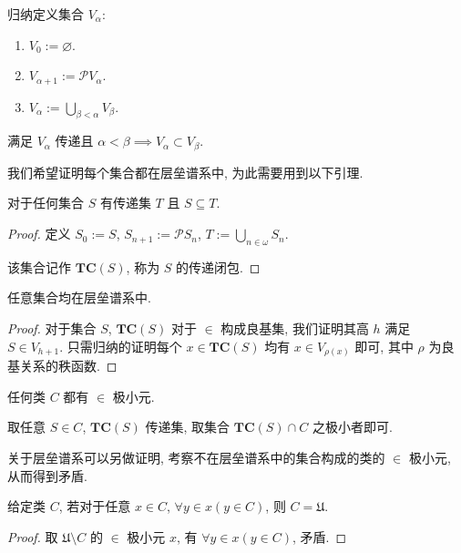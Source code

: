 \begin{definition}
    归纳定义集合 \(V_\alpha\):

    \begin{enumerate}
        \item \(V_0 := \varnothing\).
        \item \(V_{\alpha + 1} := \mathcal{P} V_\alpha\).
        \item \(V_\alpha := \bigcup_{\beta < \alpha} V_\beta\).
    \end{enumerate}

    满足 \(V_\alpha\) 传递且 \(\alpha < \beta \implies V_\alpha \subset V_\beta\).
\end{definition}

我们希望证明每个集合都在层垒谱系中, 为此需要用到以下引理.

\begin{lemma}
    对于任何集合 \(S\) 有传递集 \(T\) 且 \(S \subseteq T\).

    \begin{proof}
        定义 \(S_0 := S\), \(S_{n + 1} := \mathcal{P} S_n\), \(T := \bigcup_{n \in \omega} S_n\).

        该集合记作 \(\mathbf{TC}(S)\), 称为 \(S\) 的传递闭包.
    \end{proof}
\end{lemma}

\begin{lemma}
    \label {lemma:every set is in V_alpha}
    任意集合均在层垒谱系中.

    \begin{proof}
        对于集合 \(S\), \(\mathbf{TC}(S)\) 对于 \(\in\) 构成良基集, 我们证明其高 \(h\) 满足 \(S \in V_{h + 1}\).
        只需归纳的证明每个 \(x \in \mathbf{TC}(S)\) 均有 \(x \in V_{\rho (x)}\) 即可, 其中 \(\rho\) 为良基关系的秩函数.
    \end{proof}
\end{lemma}

\begin{lemma}
    任何类 \(C\) 都有 \(\in\) 极小元.

    取任意 \(S \in C\), \(\mathbf{TC}(S)\) 传递集, 取集合 \(\mathbf{TC}(S) \cap C\) 之极小者即可.
\end{lemma}

关于层垒谱系可以另做证明, 考察不在层垒谱系中的集合构成的类的 \(\in\) 极小元, 从而得到矛盾.

\begin{theorem}[\(\in\) 归纳]
    \label {theorem:in's induction}
    给定类 \(C\), 若对于任意 \(x \in C\), \(\forall y \in x (y \in C)\), 则 \(C = \mathfrak{U}\).

    \begin{proof}
        取 \(\mathfrak{U} \setminus C\) 的 \(\in\) 极小元 \(x\), 有 \(\forall y \in x (y \in C)\), 矛盾.
    \end{proof}
\end{theorem}

